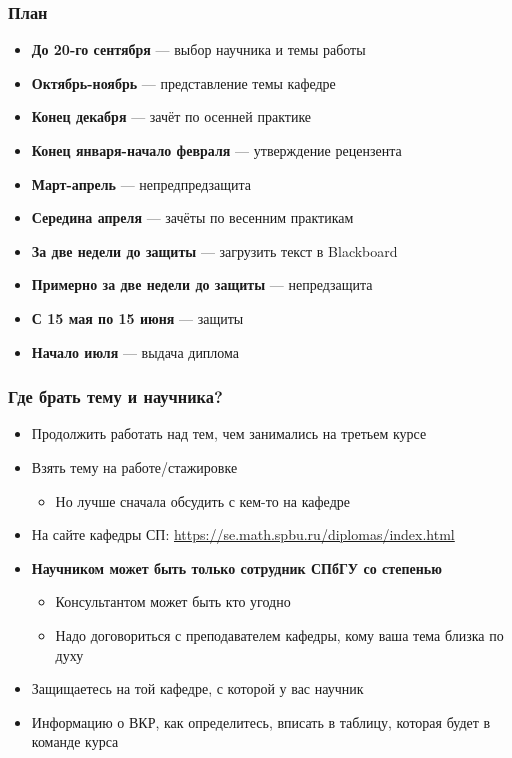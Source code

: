 \documentclass{../../slides-style}
\begin{document}
    \begin{frame}[plain]
        \titlepage
    \end{frame}

    \begin{frame}
        \frametitle{План}
        \begin{itemize}
            \item \textbf{До 20-го сентября} --- выбор научника и темы работы
            \item \textbf{Октябрь-ноябрь} --- представление темы кафедре
            \item \textbf{Конец декабря} --- зачёт по осенней практике
            \item \textbf{Конец января-начало февраля} --- утверждение рецензента
            \item \textbf{Март-апрель} --- непредпредзащита
            \item \textbf{Середина апреля} --- зачёты по весенним практикам
            \item \textbf{За две недели до защиты} --- загрузить текст в Blackboard
            \item \textbf{Примерно за две недели до защиты} --- непредзащита
            \item \textbf{С 15 мая по 15 июня} --- защиты
            \item \textbf{Начало июля} --- выдача диплома
        \end{itemize}
    \end{frame}
    
    \begin{frame}
        \frametitle{Где брать тему и научника?}
        \begin{itemize}
            \item Продолжить работать над тем, чем занимались на третьем курсе
            \item Взять тему на работе/стажировке
            \begin{itemize}
                \item Но лучше сначала обсудить с кем-то на кафедре
            \end{itemize}
            \item На сайте кафедры СП: \url{https://se.math.spbu.ru/diplomas/index.html}
            \item \textbf{Научником может быть только сотрудник СПбГУ со степенью}
            \begin{itemize}
                \item Консультантом может быть кто угодно
                \item Надо договориться с преподавателем кафедры, кому ваша тема близка по духу
            \end{itemize}
            \item Защищаетесь на той кафедре, с которой у вас научник
            \item Информацию о ВКР, как определитесь, вписать в таблицу, которая будет в команде курса
        \end{itemize}
    \end{frame}
\end{document}
